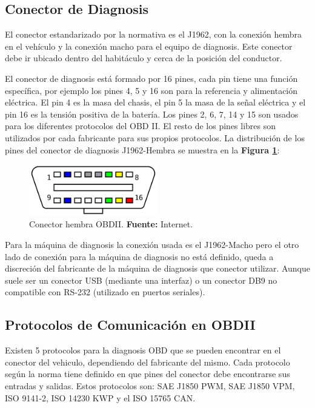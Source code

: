 \subsection{Conector de Diagnosis}

El conector estandarizado por la normativa es el J1962, con la conexión hembra en el vehículo y la conexión macho para el equipo de diagnosis. Este conector debe ir ubicado dentro del habitáculo y cerca de la posición del conductor.

El conector de diagnosis está formado por 16 pines, cada pin tiene una función específica, por ejemplo los pines 4, 5 y 16 son para la referencia y alimentación eléctrica. El pin 4 es la masa del chasis, el pin 5 la masa de la señal eléctrica y el pin 16 es la tensión positiva de la batería. Los pines 2, 6, 7, 14 y 15 son usados para los diferentes protocolos del OBD II. El resto de los pines libres son utilizados por cada fabricante para sus propios protocolos.  La distribución de los pines del conector de diagnosis J1962-Hembra se muestra en la \textbf{Figura \ref{OB}}:

\begin{figure}[H]
	\centering
		\includegraphics[width=0.5\textwidth]{./Cap3imagen/OBD_connector.png}
	\caption[Segmento del tiempo de un bit.]{Conector hembra OBDII.\textbf{ Fuente:} Internet.}
	\label{OB} %
\end{figure}

Para la máquina de diagnosis la conexión usada es el J1962-Macho pero el otro lado de conexión para la máquina de diagnosis no está definido, queda a discreción del fabricante de la máquina de diagnosis que conector utilizar.  Aunque suele ser un conector USB (mediante una interfaz) o un conector DB9 no compatible con RS-232 (utilizado en puertos seriales). 

\subsection{Protocolos de Comunicación en OBDII}

Existen 5 protocolos para la diagnosis OBD que se pueden encontrar en el conector del vehiculo, dependiendo del fabricante del mismo. Cada protocolo según la norma tiene definido en que pines del conector debe encontrarse sus entradas y salidas. Estos protocolos son: SAE J1850 PWM, SAE J1850 VPM, ISO 9141-2, ISO 14230 KWP y el ISO 15765 CAN.


